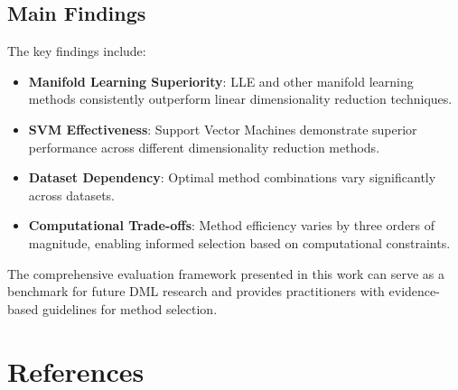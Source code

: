 \documentclass[review]{elsarticle}
\begin{document}
\subsection{Main Findings}

The key findings include:

\begin{itemize}
\item \textbf{Manifold Learning Superiority}: LLE and other manifold learning methods consistently outperform linear dimensionality reduction techniques.

\item \textbf{SVM Effectiveness}: Support Vector Machines demonstrate superior performance across different dimensionality reduction methods.

\item \textbf{Dataset Dependency}: Optimal method combinations vary significantly across datasets.

\item \textbf{Computational Trade-offs}: Method efficiency varies by three orders of magnitude, enabling informed selection based on computational constraints.
\end{itemize}

The comprehensive evaluation framework presented in this work can serve as a benchmark for future DML research and provides practitioners with evidence-based guidelines for method selection.

\section*{References}
\end{document}
